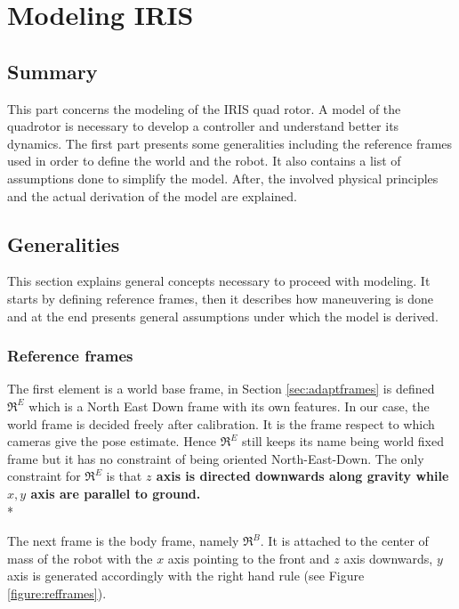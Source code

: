 
\chapter{Modeling IRIS}
\label{chap:fourth
}
\ifpdf
    \graphicspath{{Chapter4/Figures/PNG/}{Chapter4/Figures/PDF/}{Chapter4/Figures/}}
\else
    \graphicspath{{Chapter4/Figures/EPS/}{Chapter4/Figures/}}
\fi

\section*{Summary}

This part concerns the modeling of the IRIS quad rotor. A model of the quadrotor is necessary to develop a controller and understand better its dynamics. The first part presents some generalities including the reference frames used in order to define the world and the robot. It also contains a list of assumptions done to simplify the model. After, the involved physical principles and the actual derivation of the model are explained.

\section{Generalities}

This section explains general concepts necessary to proceed with modeling. It starts by defining reference frames, then it describes how maneuvering is done and at the end presents general assumptions under which the model is derived.

\subsection{Reference frames}
\label{sec:refframes}
The first element is a world base frame, in Section \ref{sec:adaptframes} is defined $\Re^E$ which is a North East Down frame with its own features. In our case, the world frame is decided freely after calibration. It is the frame respect to which cameras give the pose estimate. Hence $\Re^E$ still keeps its name being world fixed frame but it has no constraint of being oriented North-East-Down. The only constraint for $\Re^E$ is that \textbf{$z$ axis is directed downwards along gravity while $x , y$ axis are parallel to ground.} \\*

\noindent
The next frame is the body frame, namely $\Re^B$. It is attached to the center of mass of the robot with the $x$ axis pointing to the front and $z$ axis downwards, $y$ axis is generated accordingly with the right hand rule (see Figure \ref{figure:refframes}).

